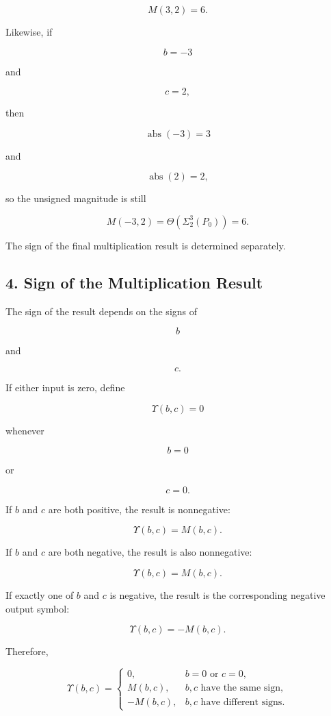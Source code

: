 \documentclass[12pt]{article}
\begin{document}
\[
M(3,2)=6.
\]

Likewise, if

\[
b=-3
\]

and

\[
c=2,
\]

then

\[
\operatorname{abs}(-3)=3
\]

and

\[
\operatorname{abs}(2)=2,
\]

so the unsigned magnitude is still

\[
M(-3,2)
=
\Theta\left(
\Sigma^3_2(P_0)
\right)
=
6.
\]

The sign of the final multiplication result is determined separately.

\subsection*{4. Sign of the Multiplication Result}

The sign of the result depends on the signs of

\[
b
\]

and

\[
c.
\]

If either input is zero, define

\[
\boxed{
\Upsilon(b,c)=0
}
\]

whenever

\[
b=0
\]

or

\[
c=0.
\]

If \(b\) and \(c\) are both positive, the result is nonnegative:

\[
\boxed{
\Upsilon(b,c)
=
M(b,c).
}
\]

If \(b\) and \(c\) are both negative, the result is also nonnegative:

\[
\boxed{
\Upsilon(b,c)
=
M(b,c).
}
\]

If exactly one of \(b\) and \(c\) is negative, the result is the corresponding negative output symbol:

\[
\boxed{
\Upsilon(b,c)
=
-M(b,c).
}
\]

Therefore,

\[
\boxed{
\Upsilon(b,c)
=
\begin{cases}
0,
&
b=0\text{ or }c=0,
\\[6pt]
M(b,c),
&
b,c\text{ have the same sign},
\\[6pt]
-M(b,c),
&
b,c\text{ have different signs}.
\end{cases}
}
\]
\end{document}
